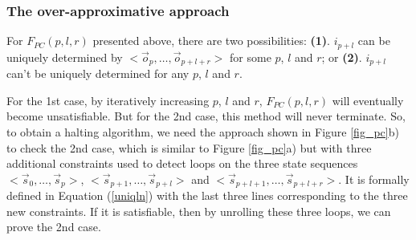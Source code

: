 \documentclass[runningheads,a4paper,orivec]{llncs}
\begin{document}
% 
% 
% 



\subsubsection{The over-approximative approach}\label{subsub_complete}
For $F_{PC}(p,l,r)$ presented above,
there are two possibilities:
\textbf{(1)}. $i_{p+l}$ can be uniquely determined by $<\vec{o}_{p},\dots,\vec{o}_{p+l+r}>$ for some $p$, $l$ and $r$;
or \textbf{(2)}. $i_{p+l}$ can't be uniquely determined for any $p$, $l$ and $r$.


For the 1st case,
by iteratively increasing  $p$, $l$ and $r$,
$F_{PC}(p,l,r)$ will eventually become unsatisfiable.
But for the 2nd case,
this method will never terminate.
So,
to obtain a halting algorithm,
we need the approach shown in Figure \ref{fig_pc}b) to check the 2nd case,
which is similar to Figure \ref{fig_pc}a) but with three additional constraints used to detect loops 
on the three state sequences $<\vec{s}_{0},\dots,\vec{s}_{p}>$, $<\vec{s}_{p+1},\dots,\vec{s}_{p+l}>$ and 
$<\vec{s}_{p+l+1},\dots,\vec{s}_{p+l+r}>$.
It is formally defined in Equation (\ref{uniqln}) 
with the last three lines corresponding to the three new constraints.
If it is satisfiable,
then by unrolling these three loops,
we can prove the 2nd case.
\end{document}
